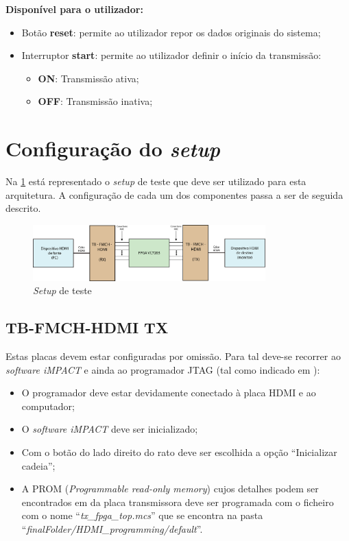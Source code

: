 \documentclass[11pt,a4paper]{article}
\begin{document}
	\textbf{Disponível para o utilizador:}
	\begin{itemize}
		\item Botão \textbf{reset}: permite ao utilizador repor os dados originais do sistema;
		\item Interruptor \textbf{start}: permite ao utilizador definir o início da transmissão:
		\begin{itemize}
			\item \textbf{ON}: Transmissão ativa;
			\item \textbf{OFF}: Transmissão inativa;
		\end{itemize}
	\end{itemize}

	\section{Configuração do \textit{setup}}
	
	Na \cref{fig:setupA} está representado o \textit{setup} de teste que deve ser utilizado para esta arquitetura. A configuração de cada um dos componentes passa a ser de seguida descrito.
	
		\begin{figure}[h!]
		\begin{center}
			\includegraphics[width=0.8\textwidth]{planBsch} 
			\caption{\textit{Setup} de teste}
			\label{fig:setupA}
		\end{center}
	\end{figure}

	\subsection{TB-FMCH-HDMI TX}
	Estas placas devem estar configuradas por omissão. Para tal deve-se recorrer ao \textit{software iMPACT} e ainda ao programador JTAG (tal como indicado em \cite{R025}):
	\begin{itemize}
		\item O programador deve estar devidamente conectado à placa HDMI e ao computador;
		\item O \textit{software iMPACT} deve ser inicializado;
		\item Com o botão do lado direito do rato deve ser escolhida a opção ``Inicializar cadeia'';
		\item A PROM (\textit{Programmable read-only memory}) cujos detalhes podem ser encontrados em \cite{R026} da placa transmissora deve ser programada com o ficheiro com o nome ``\textit{tx\_fpga\_top.mcs}'' que se encontra na pasta ``\textit{finalFolder/HDMI\_programming/default}''.
	\end{itemize}
	
\end{document}
